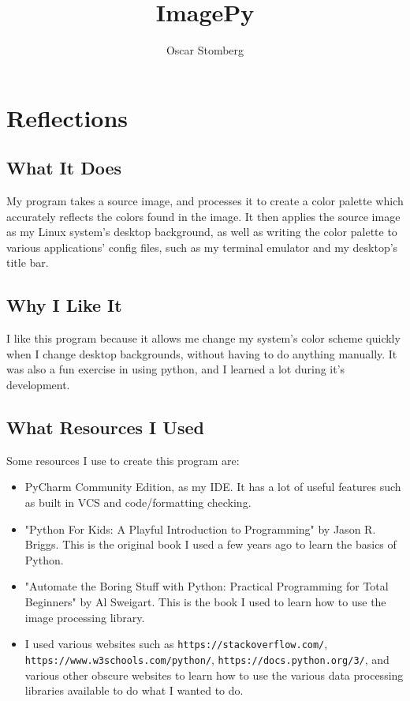\documentclass[letterpaper,12pt]{article}
\title{ImagePy}
\author{Oscar Stomberg}
\begin{document}
\maketitle
\tableofcontents
\clearpage

\section{Reflections}
\subsection{What It Does}
My program takes a source image, and processes it to create a color palette which accurately reflects the colors found in the image. It then applies the source image as my Linux system's desktop background, as well as writing the color palette to various applications' config files, such as my terminal emulator and my desktop's title bar.

\subsection{Why I Like It}
I like this program because it allows me change my system's color scheme quickly when I change desktop backgrounds, without having to do anything manually. It was also a fun exercise in using python, and I learned a lot during it's development.

\subsection{What Resources I Used}
Some resources I use to create this program are:

\begin{itemize}
	\item PyCharm Community Edition, as my IDE. It has a lot of useful features such as built in VCS and code/formatting checking.
	\item "Python For Kids: A Playful Introduction to Programming" by Jason R. Briggs. This is the original book I used a few years ago to learn the basics of Python.
	\item "Automate the Boring Stuff with Python: Practical Programming for Total Beginners" by Al Sweigart. This is the book I used to learn how to use the image processing library.
	\item I used various websites such as \texttt{https://stackoverflow.com/},\\ \texttt{https://www.w3schools.com/python/},
	\texttt{https://docs.python.org/3/}, and various other obscure websites to learn how to use the various data processing libraries available to do what I wanted to do.
\end{itemize}
\end{document}
